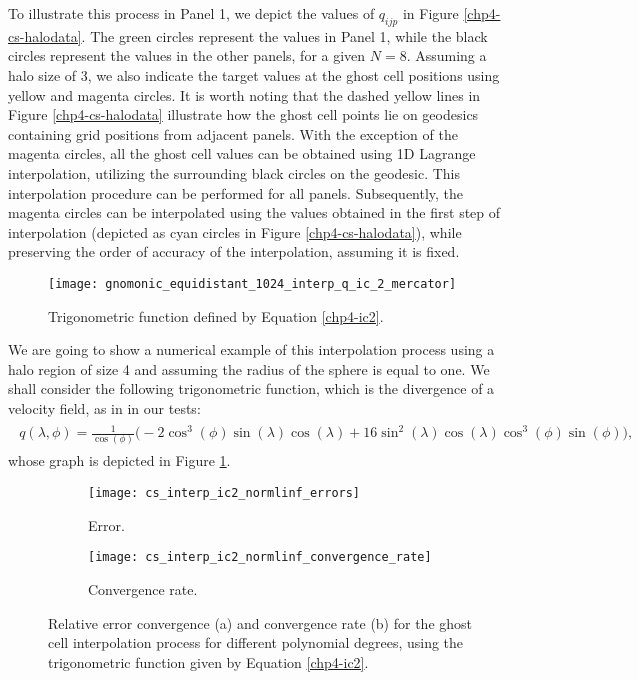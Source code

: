 To illustrate this process in Panel 1, we depict the values of $q_{ijp}$ in Figure \ref{chp4-cs-halodata}. 
The green circles represent the values in Panel 1, while the black circles 
represent the values in the other panels, for a given $N=8$. 
Assuming a halo size of 3, we also indicate the target values at the ghost cell 
positions using yellow and magenta circles. 
It is worth noting that the dashed yellow lines in Figure \ref{chp4-cs-halodata} 
illustrate how the ghost cell points lie on geodesics containing grid positions from adjacent panels.
With the exception of the magenta circles, all the ghost cell values can be obtained using 1D Lagrange interpolation, 
utilizing the surrounding black circles on the geodesic. 
This interpolation procedure can be performed for all panels. 
Subsequently, the magenta circles can be interpolated using the values obtained in the first step of interpolation 
(depicted as cyan circles in Figure \ref{chp4-cs-halodata}), 
while preserving the order of accuracy of the interpolation, assuming it is fixed. 
\begin{figure}[!htb]
	\centering
	\texttt{[image: gnomonic\_equidistant\_1024\_interp\_q\_ic\_2\_mercator]}
	\caption{Trigonometric function defined by Equation \eqref{chp4-ic2}.}
	\label{chp4-cs-ic2}
\end{figure}

We are going to show a numerical example of this interpolation process using a halo region of size 4 and 
assuming the radius of the sphere is equal to one.
We shall consider the following trigonometric function, which is the divergence of a velocity field,
as in \citet{peixoto:13} in our tests:
\begin{align}
	\label{chp4-ic2}
	\begin{split}
	q(\lambda, \phi) = \frac{1}{\cos(\phi)}\bigg(-2\cos^3(\phi) \sin(\lambda) \cos(\lambda)
	+16\sin^2(\lambda)\cos(\lambda)\cos^3(\phi)\sin(\phi)\bigg),
	\end{split}
\end{align}
whose graph is depicted in Figure \ref{chp4-cs-ic2}.
\begin{figure}[!htb]
	\centering
	\begin{subfigure}{0.45\textwidth}
		\centering
		\texttt{[image: cs\_interp\_ic2\_normlinf\_errors]}
		\caption{Error.\label{chp4-exp2-error}}
	\end{subfigure}
	\begin{subfigure}{0.45\textwidth}
		\centering
		\texttt{[image: cs\_interp\_ic2\_normlinf\_convergence\_rate]}
		\caption{Convergence rate.\label{chp4-exp2-CR}}
	\end{subfigure}
	\caption{Relative error convergence (a) and convergence rate (b) for the ghost cell interpolation process for different
		polynomial degrees, using the trigonometric function given by Equation \eqref{chp4-ic2}.\label{chp4-exp2}}
\end{figure}

